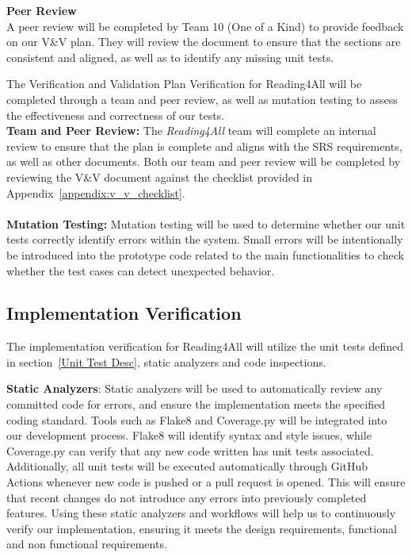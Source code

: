 \documentclass[12pt, titlepage]{article}
\begin{document}
\textbf{Peer Review}\\
A peer review will be completed by Team 10 (One of a Kind) to provide feedback on our V\&V plan. They will review the document to ensure that the sections are consistent and aligned, as well as to identify any missing unit tests.


The Verification and Validation Plan Verification for Reading4All will be completed through a team and peer review, as well as mutation testing to assess the effectiveness and correctness of our tests. \\

\textbf{Team and Peer Review:}
The \textit{Reading4All} team will complete an internal review to
ensure that the plan is complete and aligns with the SRS
requirements, as well as other documents.
Both our team and peer review will be completed by reviewing the V\&V
document against the checklist provided in
Appendix~\ref{appendix:v_v_checklist}.   \\ \\

\textbf{Mutation Testing:}
Mutation testing will be used to determine whether our unit tests correctly identify errors within the system.
Small errors will be intentionally be introduced into the prototype code related to the main functionalities to check whether the test cases can detect unexpected behavior. 


\subsection{Implementation Verification}




The implementation verification for Reading4All will utilize the unit tests defined in section~\ref{Unit Test Desc}, 
static analyzers and code inspections.

\textbf{Static Analyzers}:
Static analyzers will be used to automatically review any committed
code for errors, and ensure the implementation meets the specified
coding standard.
Tools such as Flake8 and Coverage.py will be integrated into our
development process. Flake8 will identify syntax and style issues,
while Coverage.py can verify that any new code written has unit tests
associated.
Additionally, all unit tests will be executed automatically through
GitHub Actions whenever new code is pushed or a pull request is
opened. This will ensure that recent changes do not introduce any
errors into previously completed features.
Using these static analyzers and workflows will help us to
continuously verify our implementation, ensuring it meets the design
requirements, functional and non functional requirements.
\end{document}
